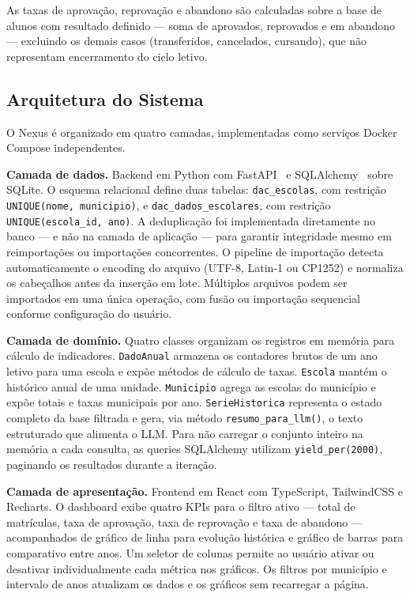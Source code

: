 \documentclass[preprint,10pt,5p]{elsarticle}
\begin{document}
As taxas de aprovação, reprovação e abandono são calculadas sobre a base de alunos com
resultado definido — soma de aprovados, reprovados e em abandono — excluindo os demais
casos (transferidos, cancelados, cursando), que não representam encerramento do ciclo
letivo.

\subsection{Arquitetura do Sistema}

O Nexus é organizado em quatro camadas, implementadas como serviços Docker Compose
independentes.

\textbf{Camada de dados.} Backend em Python com FastAPI~\cite{fastapi} e
SQLAlchemy~\cite{sqlalchemy} sobre SQLite. O esquema relacional define duas tabelas:
\texttt{dac\_escolas}, com restrição \texttt{UNIQUE(nome, municipio)}, e
\texttt{dac\_dados\_escolares}, com restrição \texttt{UNIQUE(escola\_id, ano)}.
A deduplicação foi implementada diretamente no banco — e não na camada de aplicação —
para garantir integridade mesmo em reimportações ou importações concorrentes. O pipeline
de importação detecta automaticamente o encoding do arquivo (UTF-8, Latin-1 ou CP1252) e
normaliza os cabeçalhos antes da inserção em lote. Múltiplos arquivos podem ser importados
em uma única operação, com fusão ou importação sequencial conforme configuração do usuário.

\textbf{Camada de domínio.} Quatro classes organizam os registros em memória para cálculo
de indicadores. \texttt{DadoAnual} armazena os contadores brutos de um ano letivo para uma
escola e expõe métodos de cálculo de taxas. \texttt{Escola} mantém o histórico anual de
uma unidade. \texttt{Municipio} agrega as escolas do município e expõe totais e taxas
municipais por ano. \texttt{SerieHistorica} representa o estado completo da base filtrada
e gera, via método \texttt{resumo\_para\_llm()}, o texto estruturado que alimenta o LLM.
Para não carregar o conjunto inteiro na memória a cada consulta, as queries SQLAlchemy
utilizam \texttt{yield\_per(2000)}, paginando os resultados durante a iteração.

\textbf{Camada de apresentação.} Frontend em React com TypeScript, TailwindCSS e Recharts.
O dashboard exibe quatro KPIs para o filtro ativo — total de matrículas, taxa de aprovação,
taxa de reprovação e taxa de abandono — acompanhados de gráfico de linha para evolução
histórica e gráfico de barras para comparativo entre anos. Um seletor de colunas permite ao
usuário ativar ou desativar individualmente cada métrica nos gráficos. Os filtros por
município e intervalo de anos atualizam os dados e os gráficos sem recarregar a página.
\end{document}
